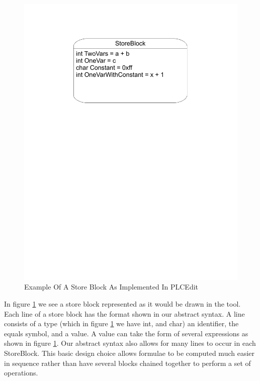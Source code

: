\begin{figure}[htp]
    \centering
    \includegraphics[trim= 20mm 175mm 20mm 10mm, clip, width=\imgmedium]{./images/state_storeblock.pdf}
    \caption{Example Of A Store Block As Implemented In PLCEdit}
    \label{fig:state_storeblock}
\end{figure}

In figure \ref{fig:state_storeblock} we see a store block represented as it would be drawn in the tool. Each line of a store block has the format shown in our abstract syntax. A line consists of a type (which in figure \ref{fig:state_storeblock} we have int, and char) an identifier, the equals symbol, and a value. A value can take the form of several expressions as shown in figure \ref{fig:state_storeblock}. Our abstract syntax also allows for many lines to occur in each StoreBlock. This basic design choice allows formulae to be computed much easier in sequence rather than have several blocks chained together to perform a set of operations.

